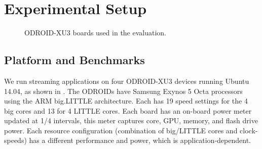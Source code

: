\section{Experimental Setup}
\begin{figure}[t]
 \caption{ODROID-XU3 boards used in the evaluation.}
 \label{fig:odroidall}
\end{figure}


\subsection{Platform and Benchmarks}
We run streaming applications on four ODROID-XU3 devices running
Ubuntu 14.04, as shown in . The ODROIDs have
Samsung Exynos 5 Octa processors using the ARM big.LITTLE
architecture.  Each has 19 speed settings for the 4 big cores and 13
for 4 LITTLE cores.  Each board has an on-board power meter updated at
1/4 \ms intervals, this meter captures core, GPU, memory, and flash
drive power.  Each resource configuration (combination of big/LITTLE
cores and clock-speeds) has a different performance and power, which
is application-dependent.

